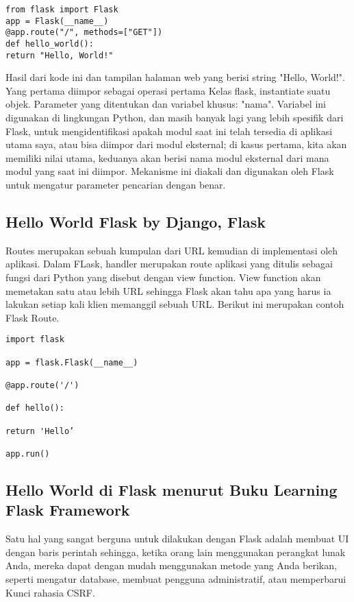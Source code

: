 \documentclass[12pt]{article}
\begin{document}
\begin{verbatim}
from flask import Flask
app = Flask(__name__)
@app.route("/", methods=["GET"])
def hello_world():
return "Hello, World!"
\end{verbatim}

Hasil dari kode ini dan tampilan halaman web yang berisi string "Hello, World!". Yang pertama diimpor sebagai operasi pertama Kelas flask, instantiate suatu objek. Parameter yang ditentukan dan variabel khusus: "nama".  Variabel ini digunakan di lingkungan Python, dan masih banyak lagi yang lebih spesifik dari Flask, untuk mengidentifikasi apakah modul saat ini telah tersedia di aplikasi utama saya, atau bisa diimpor dari modul eksternal; di kasus pertama, kita akan memiliki nilai utama, keduanya akan berisi nama modul eksternal dari mana modul yang saat ini diimpor. Mekanisme ini diakali dan digunakan oleh Flask untuk mengatur parameter pencarian dengan benar\cite{ziniqr}.

\subsection{Hello World Flask by Django, Flask}
Routes merupakan sebuah kumpulan dari URL kemudian di implementasi oleh aplikasi. Dalam FLask, handler merupakan route aplikasi yang ditulis sebagai fungsi dari Python yang disebut dengan view function. View function akan memetakan satu atau lebih URL sehingga Flask akan tahu apa yang harus ia lakukan setiap kali klien memanggil sebuah URL. Berikut ini merupakan contoh Flask Route\cite{djangoweb}.
\begin{verbatim}
import flask

app = flask.Flask(__name__)

@app.route('/')

def hello():

return 'Hello’

app.run()

\end{verbatim}

\subsection{Hello World di Flask menurut Buku Learning Flask Framework}
Satu hal yang sangat berguna untuk dilakukan dengan Flask adalah membuat UI dengan baris perintah sehingga, ketika orang lain menggunakan perangkat lunak Anda, mereka dapat dengan mudah menggunakan metode yang Anda berikan, seperti mengatur database, membuat pengguna administratif, atau memperbarui Kunci rahasia CSRF.
\end{document}
